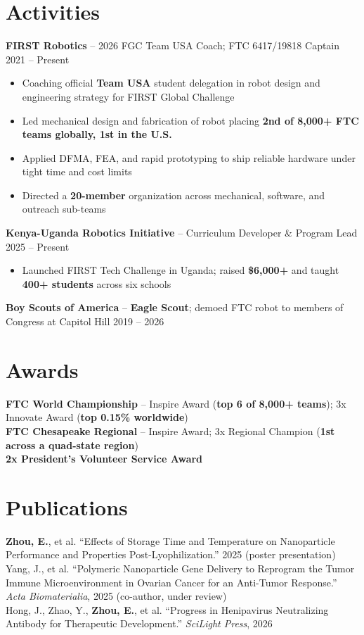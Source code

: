 \documentclass[10pt, letterpaper]{article}
\begin{document}
\section{Activities}
    \textbf{FIRST Robotics} -- 2026 FGC Team USA Coach; FTC 6417/19818 Captain
    \hfill 2021 -- Present
    \begin{itemize}
        \item Coaching official \textbf{Team USA} student delegation in robot design and engineering strategy for FIRST Global Challenge
        \item Led mechanical design and fabrication of robot placing \textbf{2nd of 8,000+ FTC teams globally, 1st in the U.S.}
        \item Applied DFMA, FEA, and rapid prototyping to ship reliable hardware under tight time and cost limits
        \item Directed a \textbf{20-member} organization across mechanical, software, and outreach sub-teams
    \end{itemize}
    \textbf{Kenya-Uganda Robotics Initiative} -- Curriculum Developer \& Program Lead
    \hfill 2025 -- Present
    \begin{itemize}
        \item Launched FIRST Tech Challenge in Uganda; raised \textbf{\$6,000+} and taught \textbf{400+ students} across six schools
    \end{itemize}
    \textbf{Boy Scouts of America} -- \textbf{Eagle Scout}; demoed FTC robot to members of Congress at Capitol Hill
    \hfill 2019 -- 2026

\section{Awards}
    \textbf{FTC World Championship} -- Inspire Award (\textbf{top 6 of 8,000+ teams}); 3x Innovate Award (\textbf{top 0.15\% worldwide}) \\
    \textbf{FTC Chesapeake Regional} -- Inspire Award; 3x Regional Champion (\textbf{1st across a quad-state region}) \\
    \textbf{2x President's Volunteer Service Award}

\section{Publications}
    \textbf{Zhou, E.}, et al. ``Effects of Storage Time and Temperature on Nanoparticle Performance and Properties Post-Lyophilization.'' 2025 (poster presentation) \\
    Yang, J., et al. ``Polymeric Nanoparticle Gene Delivery to Reprogram the Tumor Immune Microenvironment in Ovarian Cancer for an Anti-Tumor Response.'' \textit{Acta Biomaterialia}, 2025 (co-author, under review) \\
    Hong, J., Zhao, Y., \textbf{Zhou, E.}, et al. ``Progress in Henipavirus Neutralizing Antibody for Therapeutic Development.'' \textit{SciLight Press}, 2026
\end{document}
